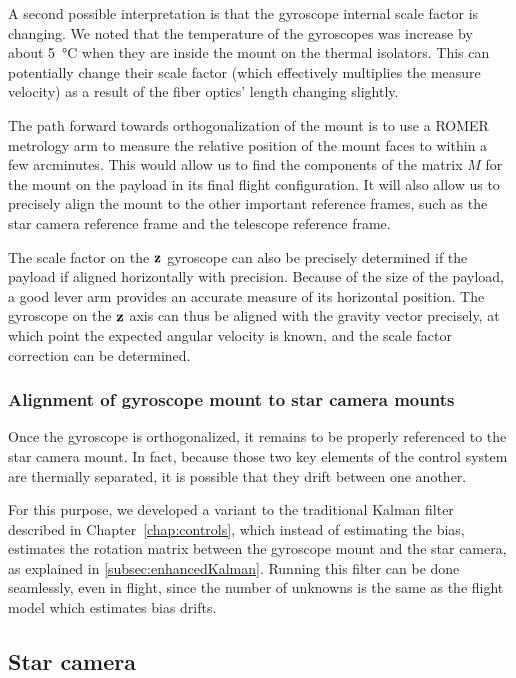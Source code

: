 A second possible interpretation is that the gyroscope internal scale factor is changing. We noted that the temperature of the gyroscopes was increase by about \SI{5}{\degreeCelsius} when they are inside the mount on the thermal isolators. This can potentially change their scale factor (which effectively multiplies the measure velocity) as a result of the fiber optics' length changing slightly. 

The path forward towards orthogonalization of the mount is to use a ROMER metrology arm to measure the relative position of the mount faces to within a few arcminutes. This would allow us to find the components of the matrix $M$ for the mount on the payload in its final flight configuration. It will also allow us to precisely align the mount to the other important reference frames, such as the star camera reference frame and the telescope reference frame.

The scale factor on the $\textrm{\textbf{z}}$ gyroscope can also be precisely determined if the payload if aligned horizontally with precision. Because of the size of the payload, a good lever arm provides an accurate measure of its horizontal position. The gyroscope on the $\textrm{\textbf{z}}$ axis can thus be aligned with the gravity vector precisely, at which point the expected angular velocity is known, and the scale factor correction can be determined.


\subsubsection{Alignment of gyroscope mount to star camera mounts}

Once the gyroscope is orthogonalized, it remains to be properly referenced to the star camera mount. In fact, because those two key elements of the control system are thermally separated, it is possible that they drift between one another. 

For this purpose, we developed a variant to the traditional Kalman filter described in Chapter~\ref{chap:controls}, which instead of estimating the bias, estimates the rotation matrix between the gyroscope mount and the star camera, as explained in \ref{subsec:enhancedKalman}. Running this filter can be done seamlessly, even in flight, since the number of unknowns is the same as the flight model which estimates bias drifts. 







\subsection{Star camera}

